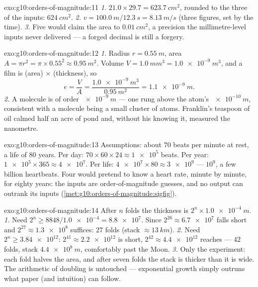\begin{solution}{exo:g10:orders-of-magnitude:11}
\emph{1.} $21.0 \times 29.7 = \qty{623.7}{cm^2}$, rounded to the three
 of the inputs: $\qty{624}{cm^2}$.
\emph{2.} $v = \qty{100.0}{m}/\qty{12.3}{s} = \qty{8.13}{m/s}$ (three
figures, set by the time).
\emph{3.} Five  would claim the area to
$\qty{0.01}{cm^2}$, a precision the millimetre-level inputs never
delivered --- a forged decimal is still a forgery.
\end{solution}

\begin{solution}{exo:g10:orders-of-magnitude:12}
\emph{1.} Radius $r = \qty{0.55}{m}$, area
$A = \pi r^{2} = \pi \times 0.55^{2} \approx \qty{0.95}{m^2}$. Volume
$V = \qty{1.0}{mm^3} = \qty{1.0e-9}{m^3}$, and a film is (area)
$\times$ (thickness), so
\[
e = \frac{V}{A} = \frac{\qty{1.0e-9}{m^3}}{\qty{0.95}{m^2}}
= \qty{1.1e-9}{m} .
\]
\emph{2.} A molecule is of order $\qty{e-9}{m}$ --- one rung above the
atom's $\qty{e-10}{m}$, consistent with a molecule being a small
cluster of atoms. Franklin's teaspoon of oil calmed half an acre of
pond and, without his knowing it, measured the nanometre.
\end{solution}

\begin{solution}{exo:g10:orders-of-magnitude:13}
Assumptions: about $70$ beats per minute at rest, a life of $80$
years. Per day: $70 \times 60 \times 24 \approx \num{1e5}$ beats. Per
year: $\num{1e5} \times 365 \approx \num{4e7}$. Per life:
$\num{4e7} \times 80 \approx \num{3e9}$ --- 
$10^{9}$, a few billion heartbeats. Four  would
pretend to know a heart rate, minute by minute, for eighty years: the
inputs are order-of-magnitude guesses, and no output can outrank its
inputs (\cref{met:g10:orders-of-magnitude:sigfig}).
\end{solution}

\begin{solution}{exo:g10:orders-of-magnitude:14}
After $n$ folds the thickness is $2^{n} \times \qty{1.0e-4}{m}$.
\emph{1.} Need $2^{n} \geq 8848/\num{1.0e-4} = \num{8.8e7}$. Since
$2^{26} \approx \num{6.7e7}$ falls short and
$2^{27} \approx \num{1.3e8}$ suffices: $27$ folds (stack
$\approx \qty{13}{km}$).
\emph{2.} Need $2^{n} \geq \num{3.84e12}$: $2^{41} \approx
\num{2.2e12}$ is short, $2^{42} \approx \num{4.4e12}$ reaches ---
$42$ folds, stack $\qty{4.4e8}{m}$, comfortably past the Moon.
\emph{3.} Only the experiment: each fold halves the area, and after
seven folds the stack is thicker than it is wide. The arithmetic of
doubling is untouched --- exponential growth simply outruns what paper
(and intuition) can follow.
\end{solution}

